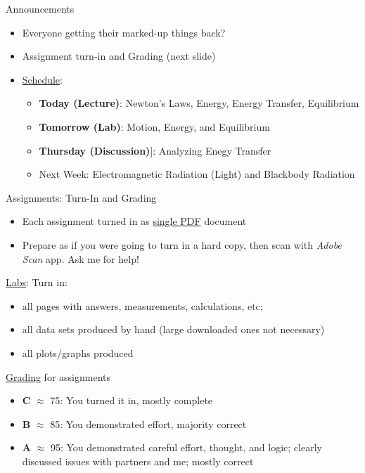 \documentclass[12pt]{beamer}
\title%
{}
\subtitle
{} %
\author%
{Ben Holder}%
\date%
{}
\begin{document}

\begin{frame}{Announcements}
	\begin{itemize}
	\addtolength{\itemsep}{0.5\baselineskip}
	\item Everyone getting their marked-up things back?
	\item Assignment turn-in and Grading (next slide)
	\item \underline{Schedule}:
		\begin{itemize}
		\item[]{\bf Today (Lecture)}: Newton's Laws, Energy, Energy Transfer, Equilibrium
		\item[]{\bf Tomorrow (Lab)}: Motion, Energy, and Equilibrium
		\item[]{\bf Thursday (Discussion)}]: Analyzing Enegy Transfer
		\item Next Week: Electromagnetic Radiation (Light) and Blackbody Radiation
		\end{itemize}
	\end{itemize}

\end{frame}
\begin{frame}{Assignments: Turn-In and Grading}
	\begin{itemize}
	\addtolength{\itemsep}{0.5\baselineskip}
	\item Each assignment turned in as \underline{single PDF} document
	\item Prepare as if you were going to turn in a hard copy, then scan with {\em Adobe Scan} app. Ask me for help!
	\end{itemize}
	
	\underline{Labs}: Turn in:
		\begin{itemize}
		\item all pages with answers, measurements, calculations, etc; 
		\item all data sets produced by hand (large downloaded ones not necessary)
		\item all plots/graphs produced
		\end{itemize}
	\underline{Grading} for assignments
		\begin{itemize}
		\item[]{\bf C} $\approx$ 75: You turned it in, mostly complete
		\item[]{\bf B} $\approx$ 85: You demonstrated effort, majority correct
		\item[]{\bf A} $\approx$ 95: You demonstrated careful effort, thought, and logic; clearly discussed issues with partners and me;  mostly correct
		\end{itemize}

\end{frame}
\end{document}

